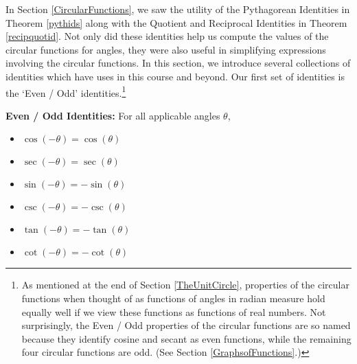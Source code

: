 

\setcounter{footnote}{0}

\label{Identities}

In Section \ref{CircularFunctions}, we saw the utility of the Pythagorean Identities in Theorem \ref{pythids} along with the Quotient and Reciprocal Identities in Theorem \ref{recipquotid}.  Not only did these identities help us compute the values of the circular functions for angles, they were also useful in simplifying expressions involving the circular functions.  In this section, we introduce several collections of identities which have uses in this course and beyond.  Our first set of identities is the `Even / Odd' identities.\footnote{As mentioned at the end of Section \ref{TheUnitCircle}, properties of the circular functions when thought of as functions of angles in radian measure hold equally well if we view these functions as functions of real numbers.  Not surprisingly, the Even / Odd properties of the circular functions are so named because they identify cosine and secant as even functions, while the remaining four circular functions are odd.  (See Section \ref{GraphsofFunctions}.)}

\smallskip

\colorbox{ResultColor}{\bbm

\begin{thm} \label{evenodd}  \textbf{Even / Odd Identities:}  For all applicable angles $\theta$,  

\vspace{-.05in}

\begin{multicols}{3}

\begin{itemize}

\item  $\cos(-\theta) = \cos(\theta)$

\item  $\sec(-\theta) = \sec(\theta)$

\item  $\sin(-\theta) = -\sin(\theta)$

\item  $\csc(-\theta) = -\csc(\theta)$

\item  $\tan(-\theta) = -\tan(\theta)$

\item  $\cot(-\theta) = -\cot(\theta)$

\end{itemize}

\end{multicols}

\end{thm}

\hspace{.1in} 

\vspace*{-.25in}

\ebm}


